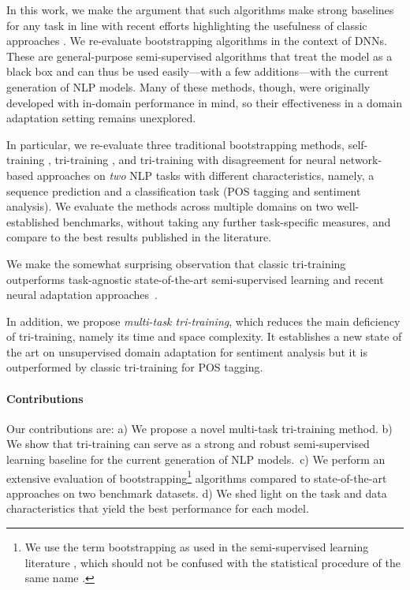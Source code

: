 \documentclass[11pt,a4paper]{article}
\begin{document}
In this work, we make the argument that such algorithms make strong baselines for any task in line with recent efforts highlighting the usefulness of classic approaches 
\cite{Melis2017,Denkowski:Neubig:2017}. We re-evaluate bootstrapping algorithms in the context of DNNs. These are general-purpose semi-supervised algorithms that treat the model as a black box and can thus be used easily---with a few additions---with the current generation of NLP models. Many of these methods, though, were originally developed with in-domain performance in mind, so their effectiveness in a domain adaptation setting remains unexplored.

In particular, we re-evaluate three traditional bootstrapping methods, self-training \cite{Yarowsky1995}, tri-training \cite{Zhou2005}, and tri-training with disagreement \cite{Sogaard2010} for neural network-based approaches on \textit{two} NLP tasks with different characteristics, namely, a sequence prediction and a classification task (POS tagging and sentiment analysis). We evaluate the methods across multiple domains on two well-established benchmarks, without taking any further task-specific measures, and compare to the best results published in the literature.

We make the somewhat surprising observation that classic tri-training outperforms task-agnostic state-of-the-art semi-supervised learning \cite{Laine2017} and recent neural adaptation approaches~\cite{Ganin2016,Saito2017}.

In addition, we propose \emph{multi-task tri-training}, which reduces the main deficiency of tri-training, namely its time and space complexity. It establishes a new state of the art on unsupervised domain adaptation for sentiment analysis but it is outperformed by classic tri-training for POS tagging.

\paragraph{Contributions} Our contributions are: a) We propose a novel multi-task tri-training method. b) We show that tri-training can serve as a strong and robust semi-supervised learning baseline for the current generation of NLP models.\ c) We perform an extensive evaluation of bootstrapping\footnote{We use the term bootstrapping as used in the semi-supervised learning literature \cite{Zhu2005}, which should not be confused with the statistical procedure of the same name \cite{efron1994introduction}.} algorithms compared to state-of-the-art approaches on two benchmark datasets. d) We shed light on the task and data characteristics that yield the best performance for each model.
\end{document}
